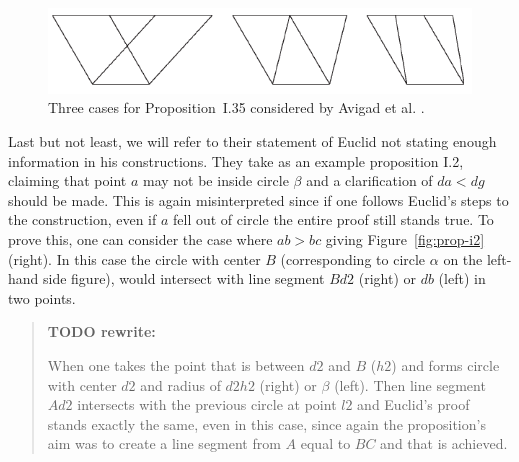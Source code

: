 \documentclass[]{interact}
\theoremstyle{plain}
\theoremstyle{definition}
\theoremstyle{remark}
\newcommand{\comment}[2]
{
\begin{quote}
\textbf{#1:}
     #2
\end{quote}
}
\begin{document}
\begin{figure}[h]
  \centering
  \includegraphics[scale=0.7]{avigad-fig9-I35}
  \caption[Avigad et al Approach I.35]{Three cases for
    Proposition~I.35 considered by Avigad et al. \cite{avigad-etal:2009}.}
  \label{fig:avigadi35}
\end{figure}


Last but not least, we will refer to their statement of Euclid not
stating enough information in his constructions. They take as an
example proposition I.2, claiming that point $a$ may not be inside
circle $\beta$ and a clarification of $da<dg$ should be made. This is
again misinterpreted since if one follows Euclid's steps to the
construction, even if $a$ fell out of circle the entire proof still
stands true. To prove this, one can consider the case where $ab>bc$
giving Figure~\ref{fig:prop-i2} (right). In this case the
circle with center $B$ (corresponding to circle $\alpha$ on the
left-hand side figure), would intersect with line
segment $Bd2$ (right) or $db$ (left) in two points.
\comment{TODO rewrite}{
When one takes the point that is between $d2$ and $B$ ($h2$) and
forms circle with center $d2$ and radius of $d2h2$ (right) or $\beta$ (left). 
Then line segment $Ad2$ intersects with the previous circle at point $l2$ and 
Euclid's proof stands exactly the same, even in this case, since again
the proposition's aim was to create a line segment from $A$ equal to
$BC$ and that is achieved.
}
\end{document}
